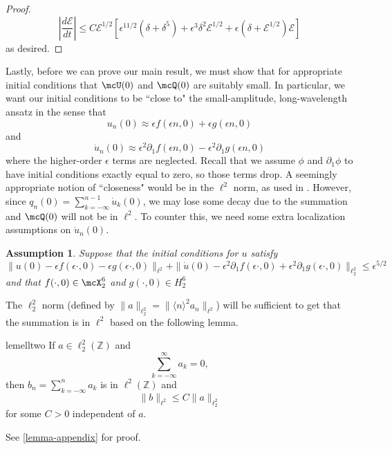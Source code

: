 \documentclass[oneside,reqno]{amsart}
\newcommand{\Z}{\mathbb{Z}}
\newtheorem{assum}{Assumption}
\begin{document}
\begin{proof}
	\begin{equation*}
		\left|\frac{d\mathcal E}{dt} \right| \leq C \mathcal E^{1/2}\left[ \epsilon^{11/2} (\delta + \delta^5)  + \epsilon^3\delta^2\mathcal E^{1/2} + \epsilon(\delta + \mathcal{E}^{1/2})\mathcal E\right]
	\end{equation*}
	as desired.
\end{proof}


Lastly, before we can prove our main result, we must show that for appropriate initial conditions that \(\mcU(0)\) and \(\mcQ(0)\) are suitably small. In particular, we want our initial conditions to be ``close to" the small-amplitude, long-wavelength ansatz in the sense that 
\begin{equation*}
	u_n(0) \approx \epsilon f(\epsilon n , 0) + \epsilon g(\epsilon n , 0)
\end{equation*}
and 
\begin{equation*}
	\dot u_n(0) \approx \epsilon^2 \partial_1 f(\epsilon n , 0) -\epsilon^2 \partial_ 1 g(\epsilon n,0)
\end{equation*}
where the higher-order \(\epsilon\) terms are neglected. Recall that we assume \(\phi\) and \(\partial_1\phi\) to have initial conditions exactly equal to zero, so those terms drop. A seemingly appropriate notion of ``closeness" would be in the \(\ell^2\) norm, as used in \cites{khan2017long,schneider2000counter}. However, since \(q_n(0) = \sum_{k=-\infty}^{n-1} \dot u_{k}(0)\), we may lose some decay due to the summation and \(\mcQ(0)\) will not be in \(\ell^2\). To counter this, we need some extra localization assumptions on \(\dot u_n(0)\).

\begin{assum}\label{assumption-3}
	Suppose that the initial conditions for \(u\) satisfy
	\begin{equation*}
		\| u(0) - \epsilon f(\epsilon \cdot, 0) - \epsilon g(\epsilon \cdot, 0) \|_{\ell^2} + \| \dot u(0) - \epsilon^2 \partial_1 f(\epsilon \cdot, 0) + \epsilon^2 \partial_1 g (\epsilon \cdot , 0) \|_{\ell^2_2} \leq \epsilon^{5/2}
	\end{equation*}
	and that \(f(\cdot, 0) \in \mcX^6_2\) and \(g(\cdot, 0) \in H^6_2\)
\end{assum}

The \(\ell^2_2\) norm (defined by \(\|a\|_{\ell^2_2} = \| \langle n \rangle^2 a_n\|_{\ell^2}\)) will be sufficient to get that the summation is in \(\ell^2\) based on the following lemma.
\begin{restatable}{lem}{elltwo}
	\label{ell22-lemma}
	If \(a\in \ell^2_2(\Z)\) and 
	\begin{equation*}
		\sum_{k=-\infty}^\infty a_k = 0,
	\end{equation*}
	then \(b_n = \sum_{k=-\infty}^n a_k\) is in \(\ell^2(\Z)\) and 
	\begin{equation*}
		\|b\|_{\ell^2} \leq C \|a\|_{\ell^2_2}
	\end{equation*}
	for some \(C> 0\) independent of \(a\).
\end{restatable} 
See \cref{lemma-appendix} for proof.
\end{document}
